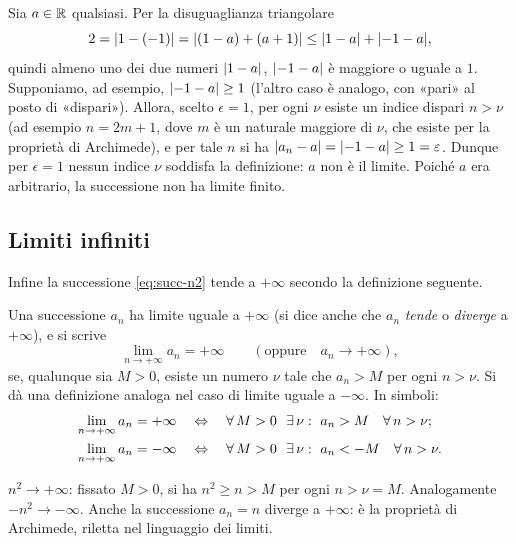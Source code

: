 \begin{dimostrazione}
Sia $a\in\mathbb{R}$ qualsiasi. Per la disuguaglianza triangolare
\[
  2=\lvert 1-(-1)\rvert=\lvert (1-a)+(a+1)\rvert\le\lvert 1-a\rvert+\lvert -1-a\rvert,
\]
quindi almeno uno dei due numeri $\lvert 1-a\rvert$, $\lvert -1-a\rvert$ è maggiore o uguale a $1$.
Supponiamo, ad esempio, $\lvert -1-a\rvert\ge1$ (l'altro caso è analogo, con «pari» al posto di
«dispari»). Allora, scelto $\epsilon=1$, per ogni $\nu$ esiste un indice dispari $n>\nu$
(ad esempio $n=2m+1$, dove $m$ è un naturale maggiore di $\nu$, che esiste per la
proprietà di Archimede), e per tale $n$ si ha $\lvert a_{n}-a\rvert=\lvert -1-a\rvert\ge1=\varepsilon$.
Dunque per $\epsilon=1$ nessun indice $\nu$ soddisfa la definizione: $a$ non è il limite.
Poiché $a$ era arbitrario, la successione non ha limite finito.
\end{dimostrazione}

\subsection{Limiti infiniti}

Infine la successione \eqref{eq:succ-n2} tende a $+\infty$ secondo la definizione
seguente.

\begin{definizione}\label{def:limite-infinito}
Una successione $a_{n}$ ha limite uguale a $+\infty$ (si dice anche che $a_{n}$
\emph{tende} o \emph{diverge} a $+\infty$), e si scrive
\begin{equation}\label{eq:lim-piu-infinito}
  \lim_{n\to+\infty}a_{n}=+\infty \qquad(\text{oppure}\quad a_{n}\to+\infty),
\end{equation}
se, qualunque sia $M>0$, esiste un numero $\nu$ tale che $a_{n}>M$ per ogni $n>\nu$. Si
dà una definizione analoga nel caso di limite uguale a $-\infty$. In simboli:
\begin{align}
  \lim_{n\to+\infty}a_{n}=+\infty \quad&\sse\quad \perogni M>0\ \ \esiste\nu :\ a_{n}>M \quad\perogni n>\nu; \label{eq:def-piu-inf}\\
  \lim_{n\to+\infty}a_{n}=-\infty \quad&\sse\quad \perogni M>0\ \ \esiste\nu :\ a_{n}<-M \quad\perogni n>\nu. \label{eq:def-meno-inf}
\end{align}
\end{definizione}

\begin{esempio}
$n^{2}\to+\infty$: fissato $M>0$, si ha $n^{2}\ge n>M$ per ogni $n>\nu=M$. Analogamente
$-n^{2}\to-\infty$. Anche la successione $a_{n}=n$ diverge a $+\infty$: è la proprietà di
Archimede, riletta nel linguaggio dei limiti.
\end{esempio}

